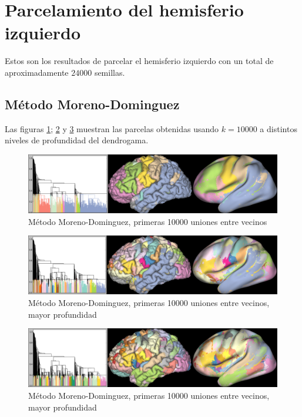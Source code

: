 \section{Parcelamiento del hemisferio izquierdo}

Estos son los resultados de parcelar el hemisferio izquierdo con un total de
aproximadamente $24000$ semillas. 

\subsection{M\'etodo Moreno-Dominguez}

Las figuras \ref{fig:moreno_corteza0}; \ref{fig:moreno_corteza1} y \ref{fig:moreno_corteza2}
muestran las parcelas obtenidas usando $k=10000$ a distintos niveles de profundidad
del dendrogama.

\begin{figure}[h!]
    \includegraphics[width=\textwidth]{img/all_brain/moreno_10000.png}
    \caption{M\'etodo Moreno-Dominguez, primeras 10000 uniones entre vecinos}
    \label{fig:moreno_corteza0}
\end{figure}

\begin{figure}[h!]
    \includegraphics[width=\textwidth]{img/all_brain/moreno_10000_deep0.png}
    \caption{M\'etodo Moreno-Dominguez, primeras 10000 uniones entre vecinos, mayor profundidad}
    \label{fig:moreno_corteza1}
\end{figure}

\begin{figure}[h!]
    \includegraphics[width=\textwidth]{img/all_brain/moreno_10000_deep1.png}
    \caption{M\'etodo Moreno-Dominguez, primeras 10000 uniones entre vecinos, mayor profundidad}
    \label{fig:moreno_corteza2}             
\end{figure}

